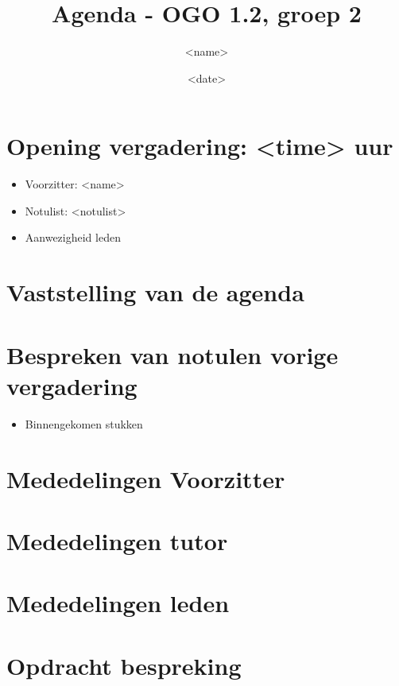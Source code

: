 \documentclass[]{article}
\title{Agenda - OGO 1.2, groep 2}
\author{ <name> \\ }
\date{<date>}
\begin{document}
\ifpdf
{}
\else
{}
\fi

\maketitle


\section{Opening vergadering: <time> uur }
  \begin{itemize}
    \item Voorzitter: <name>
    \item Notulist: <notulist>
    \item Aanwezigheid leden
  \end{itemize}

\section{Vaststelling van de agenda}

\section{Bespreken van notulen vorige vergadering}

  \begin{itemize}
     \item Binnengekomen stukken
  \end{itemize}

\section{Mededelingen Voorzitter}


\section{Mededelingen tutor}

\section{Mededelingen leden}

\section{Opdracht bespreking}
\end{document}
